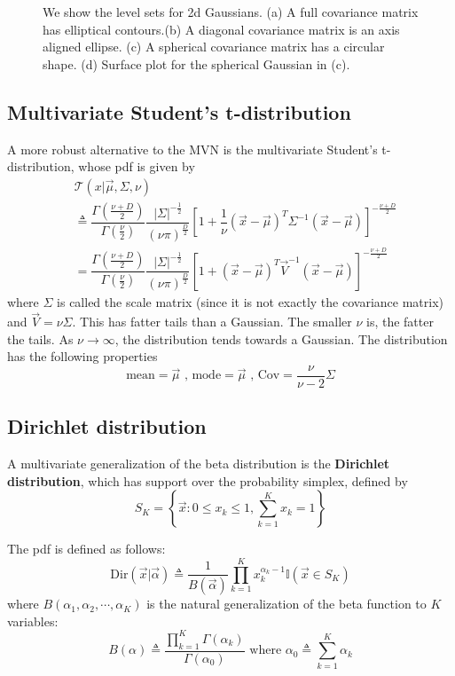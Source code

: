 \documentclass[graybox, envcountchap, twocolumn]{styles/svmult}
\begin{document}
\begin{figure}[hbtp]
\caption{We show the level sets for 2d Gaussians. (a) A full covariance matrix has elliptical contours.(b) A diagonal covariance matrix is an axis aligned ellipse. (c) A spherical covariance matrix has a circular shape. (d) Surface plot for the spherical Gaussian in (c).}
\label{fig:2d-Gaussions} 
\end{figure}


\subsection{Multivariate Student's t-distribution}
A more robust alternative to the MVN is the multivariate Student's t-distribution, whose pdf is given by
\begin{align}
& \mathcal{T}(x|\vec{\mu},\Sigma,\nu) \nonumber \\
& \triangleq \dfrac{\Gamma(\frac{\nu+D}{2})}{\Gamma(\frac{\nu}{2})}\dfrac{|\Sigma|^{-\frac{1}{2}}}{\left(\nu\pi\right)^{\frac{D}{2}}}\left[1+\dfrac{1}{\nu}\left(\vec{x}-\vec{\mu}\right)^T\Sigma^{-1}\left(\vec{x}-\vec{\mu}\right)\right]^{-\frac{\nu+D}{2}} \\
&= \dfrac{\Gamma(\frac{\nu+D}{2})}{\Gamma(\frac{\nu}{2})}\dfrac{|\Sigma|^{-\frac{1}{2}}}{\left(\nu\pi\right)^{\frac{D}{2}}}\left[1+\left(\vec{x}-\vec{\mu}\right)^T\vec{V}^{-1}\left(\vec{x}-\vec{\mu}\right)\right]^{-\frac{\nu+D}{2}}
\end{align}
where $\Sigma$ is called the scale matrix (since it is not exactly the covariance matrix) and $\vec{V}=\nu\Sigma$. This has fatter tails than a Gaussian. The smaller $\nu$ is, the fatter the tails. As $\nu \rightarrow \infty$, the distribution tends towards a Gaussian. The distribution has the following properties
\begin{equation}
\text{mean}=\vec{\mu} \text{ , mode}=\vec{\mu} \text{ , Cov}= \dfrac{\nu}{\nu-2}\Sigma
\end{equation}


\subsection{Dirichlet distribution}
A multivariate generalization of the beta distribution is the \textbf{Dirichlet distribution}, which has
support over the probability simplex, defined by
\begin{equation}
S_K=\left\{\vec{x}:0 \leq x_k \leq 1,\sum\limits_{k=1}^K x_k=1\right\}
\end{equation}

The pdf is defined as follows:
\begin{equation}
\text{Dir}(\vec{x}|\vec{\alpha}) \triangleq \dfrac{1}{B(\vec{\alpha})}\prod\limits_{k=1}^K x_k^{\alpha_k-1}\mathbb{I}(\vec{x} \in S_K)
\end{equation}
where $B(\alpha_1,\alpha_2,\cdots,\alpha_K)$ is the natural generalization of the beta function to $K$ variables:
\begin{equation}
B(\alpha) \triangleq \dfrac{\prod_{k=1}^K \Gamma(\alpha_k)}{\Gamma(\alpha_0)} \text{ where } \alpha_0 \triangleq \sum_{k=1}^K \alpha_k
\end{equation}
\end{document}

